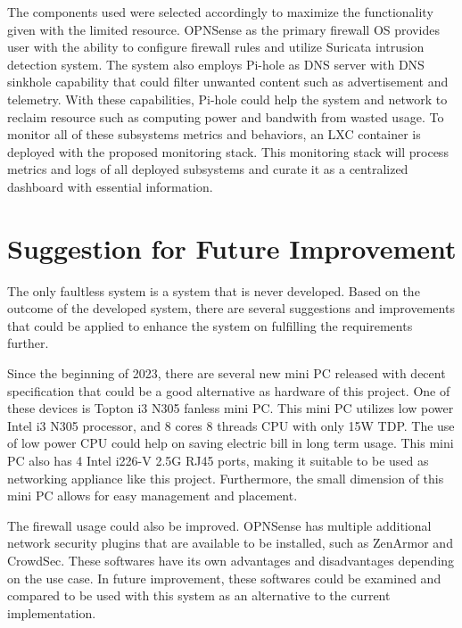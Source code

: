 \documentclass[../index.tex]{subfiles}
\begin{document}
The components used were selected accordingly to maximize the functionality given with the limited
resource. OPNSense as the primary firewall OS provides user with the ability to configure firewall
rules and utilize Suricata intrusion detection system. The system also employs Pi-hole as DNS server
with DNS sinkhole capability that could filter unwanted content such as advertisement and telemetry.
With these capabilities, Pi-hole could help the system and network to reclaim resource such as
computing power and bandwith from wasted usage. To monitor all of these subsystems metrics and
behaviors, an LXC container is deployed with the proposed monitoring stack. This monitoring stack
will process metrics and logs of all deployed subsystems and curate it as a centralized dashboard
with essential information.

\section{Suggestion for Future Improvement}

The only faultless system is a system that is never developed. Based on the outcome of the developed
system, there are several suggestions and improvements that could be applied to enhance the system
on fulfilling the requirements further.

Since the beginning of 2023, there are several new mini PC released with decent specification that
could be a good alternative as hardware of this project. One of these devices is Topton i3 N305
fanless mini PC. This mini PC utilizes low power Intel i3 N305 processor, and 8 cores 8 threads CPU
with only 15W TDP. The use of low power CPU could help on saving electric bill in long term usage.
This mini PC also has 4 Intel i226-V 2.5G RJ45 ports, making it suitable to be used as networking
appliance like this project. Furthermore, the small dimension of this mini PC allows for easy
management and placement.

The firewall usage could also be improved. OPNSense has multiple additional network security plugins
that are available to be installed, such as ZenArmor and CrowdSec. These softwares have its own
advantages and disadvantages depending on the use case. In future improvement, these softwares could
be examined and compared to be used with this system as an alternative to the current
implementation.
\end{document}
